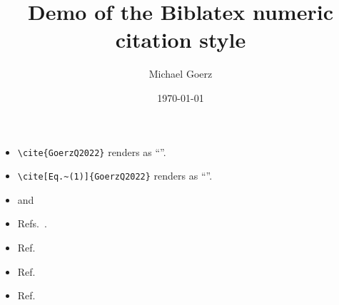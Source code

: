 \documentclass{article}
\def\Author{Michael Goerz}
\def\Title{Demo of the Biblatex numeric citation style}
\begin{document}
\title{\Title}
\author{\Author}
\date{\today}

\maketitle

\begin{itemize}
  \item \verb|\cite{GoerzQ2022}| renders as ``\cite{GoerzQ2022}''.
  \item \verb|\cite[Eq.~(1)]{GoerzQ2022}| renders as ``\cite[Eq.~(1)]{GoerzQ2022}''.
  \item \cite{GoerzPhd2015} and \cite{Luc-KoenigEPJD2004}
  \item Refs.~\cite[and references therein]{WinckelIP2008,BrumerShapiro2003,BrifNJP2010,Shapiro2012,KochJPCM2016,GoerzQ2022,SolaAAMOP2018,MorzhinRMS2019,KochEPJQT2022}.
  \item Ref.~\cite{WP_Schroedinger}
  \item Ref.~\cite{NielsenChuangCh10QEC, AnderssonSGS2014, SuominenSGS2014, DevoretLH1995, PaszkeNIPS2019,JuhlARNMRS2020,PercontiSPIE2016,Giles2008}
  \item Ref.~\cite{GoerzPhd2015, Giles2008b, Nolting1997Coulomb}
\end{itemize}

\printbibliography
\end{document}

